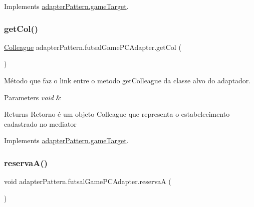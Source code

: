 Implements \mbox{\hyperlink{interfaceadapter_pattern_1_1game_target_a32fce3f3dd420116a031b051f2464304}{adapter\+Pattern.\+game\+Target}}.

\mbox{\label{classadapter_pattern_1_1futsal_game_p_c_adapter_a5521d22c8ffdcedf28b517679bc19e29}} 
\subsubsection{\texorpdfstring{getCol()}{getCol()}}
{\footnotesize\ttfamily \mbox{\hyperlink{classmediator_pattern_1_1_colleague}{Colleague}} adapter\+Pattern.\+futsal\+Game\+P\+C\+Adapter.\+get\+Col (\begin{DoxyParamCaption}{ }\end{DoxyParamCaption})}



Método que faz o link entre o metodo get\+Colleague da classe alvo do adaptador. 


\begin{DoxyParams}{Parameters}
{\em void} & \\
\hline
\end{DoxyParams}
\begin{DoxyReturn}{Returns}
Retorno é um objeto Colleague que representa o estabelecimento cadastrado no mediator 
\end{DoxyReturn}


Implements \mbox{\hyperlink{interfaceadapter_pattern_1_1game_target_ad3fc8b4c4a732bcc875071ed0c081261}{adapter\+Pattern.\+game\+Target}}.

\mbox{\label{classadapter_pattern_1_1futsal_game_p_c_adapter_a73e3f8292b7e59d30793ea7aa9f5ab29}} 
\subsubsection{\texorpdfstring{reservaA()}{reservaA()}}
{\footnotesize\ttfamily void adapter\+Pattern.\+futsal\+Game\+P\+C\+Adapter.\+reservaA (\begin{DoxyParamCaption}{ }\end{DoxyParamCaption})}



